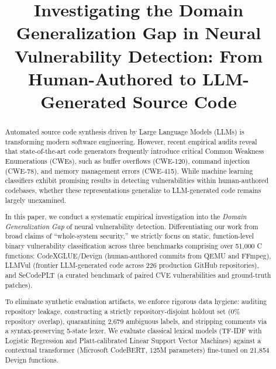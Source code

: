\documentclass[conference]{IEEEtran}
\begin{document}
\title{Investigating the Domain Generalization Gap in Neural Vulnerability Detection: From Human-Authored to LLM-Generated Source Code}

\author{
}

\maketitle

\begin{abstract}
Automated source code synthesis driven by Large Language Models (LLMs) is transforming modern software engineering. However, recent empirical audits reveal that state-of-the-art code generators frequently introduce critical Common Weakness Enumerations (CWEs), such as buffer overflows (CWE-120), command injection (CWE-78), and memory management errors (CWE-415). While machine learning classifiers exhibit promising results in detecting vulnerabilities within human-authored codebases, whether these representations generalize to LLM-generated code remains largely unexamined.

In this paper, we conduct a systematic empirical investigation into the \textit{Domain Generalization Gap} of neural vulnerability detection. Differentiating our work from broad claims of ``whole-system security,'' we strictly focus on static, function-level binary vulnerability classification across three benchmarks comprising over 51,000 C functions: CodeXGLUE/Devign (human-authored commits from QEMU and FFmpeg), LLMVul (frontier LLM-generated code across 226 production GitHub repositories), and SeCodePLT (a curated benchmark of paired CVE vulnerabilities and ground-truth patches).

To eliminate synthetic evaluation artifacts, we enforce rigorous data hygiene: auditing repository leakage, constructing a strictly repository-disjoint holdout set ($0\%$ repository overlap), quarantining 2,679 ambiguous labels, and stripping comments via a syntax-preserving 5-state lexer. We evaluate classical lexical models (TF-IDF with Logistic Regression and Platt-calibrated Linear Support Vector Machines) against a contextual transformer (Microsoft CodeBERT, 125M parameters) fine-tuned on 21,854 Devign functions.


\end{abstract}
\end{document}
